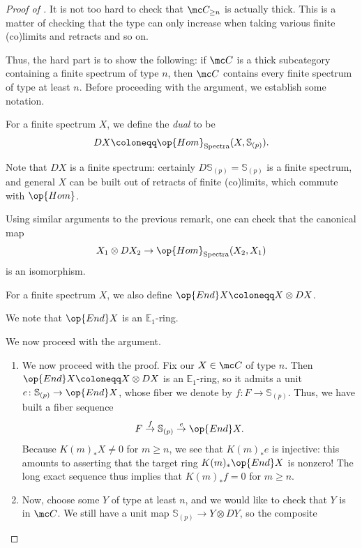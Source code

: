 \documentclass[../notes.tex]{subfiles}
\begin{document}
\begin{proof}[Proof of ]
	It is not too hard to check that $\mc C_{\ge n}$ is actually thick. This is a matter of checking that the type can only increase when taking various finite (co)limits and retracts and so on.

	Thus, the hard part is to show the following: if $\mc C$ is a thick subcategory containing a finite spectrum of type $n$, then $\mc C$ contains every finite spectrum of type at least $n$. Before proceeding with the argument, we establish some notation.
	\begin{definition}[dual]
		For a finite spectrum $X$, we define the \textit{dual} to be
		\[DX\coloneqq\op{Hom}_{\mathrm{Spectra}}(X,\mathbb S_{(p)}).\]
	\end{definition}
	\begin{remark}
		Note that $DX$ is a finite spectrum: certainly $D\mathbb S_{(p)}=\mathbb S_{(p)}$ is a finite spectrum, and general $X$ can be built out of retracts of finite (co)limits, which commute with $\op{Hom}$.
	\end{remark}
	\begin{remark}
		Using similar arguments to the previous remark, one can check that the canonical map
		\[X_1\otimes DX_2\to\op{Hom}_{\mathrm{Spectra}}(X_2,X_1)\]
		is an isomorphism.
	\end{remark}
	\begin{notation}
		For a finite spectrum $X$, we also define $\op{End}X\coloneqq X\otimes DX$.
	\end{notation}
	\begin{remark}
		We note that $\op{End}X$ is an $\mathbb E_1$-ring.
	\end{remark}
	We now proceed with the argument.
	\begin{enumerate}
		\item We now proceed with the proof. Fix our $X\in\mc C$ of type $n$. Then $\op{End}X\coloneqq X\otimes DX$ is an $\mathbb E_1$-ring, so it admits a unit $e\colon\mathbb S_{(p)}\to\op{End}X$, whose fiber we denote by $f\colon F\to\mathbb S_{(p)}$. Thus, we have built a fiber sequence
		\[F\stackrel f\to\mathbb S_{(p)}\stackrel e\to\op{End}X.\]
		Because $K(m)_*X\ne0$ for $m\ge n$, we see that $K(m)_*e$ is injective: this amounts to asserting that the target ring $K(m)_*\op{End}X$ is nonzero! The long exact sequence thus implies that $K(m)_*f=0$ for $m\ge n$.
		\item Now, choose some $Y$ of type at least $n$, and we would like to check that $Y$ is in $\mc C$. We still have a unit map $\mathbb S_{(p)}\to Y\otimes DY$, so the composite

\end{enumerate}
\end{proof}
\end{document}
